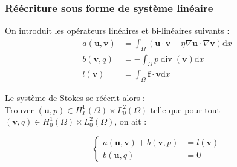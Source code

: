 \subsubsection{Réécriture sous forme de système linéaire}
On introduit les opérateurs linéaires et bi-linéaires suivants : 
\begin{equation}
\begin{aligned}
a(\mathbf{u}, \mathbf{v}) &=\int_{\Omega}( \mathbf{u} \cdot \mathbf{v}-\eta \nabla \mathbf{u} \cdot \nabla \mathbf{v} ) \mathrm{d} x \\
b(\mathbf{v}, q) &=-\int_{\Omega} p \operatorname{div} (\mathbf{v}) \mathrm{d} x \\
l(\mathbf{v}) &=\int_{\Omega} \mathbf{f} \cdot \mathbf{v} \mathrm{d} x
\end{aligned}
\end{equation}

Le système de Stokes se réécrit alors : \\
Trouver $(\mathbf{u}, p) \in H^{1}_{\Gamma}(\Omega) \times L_{0}^{2}(\Omega)$ telle que pour tout 
$(\mathbf{v}, q) \in H^{1}_{0}(\Omega) \times L_{0}^{2}(\Omega)$, on ait : 

\begin{equation}
\left\{\begin{aligned}
a(\mathbf{u}, \mathbf{v})+b(\mathbf{v}, p) &=l(\mathbf{v}) \\
b(\mathbf{u}, q) &=0
\end{aligned}\right.
\end{equation}


